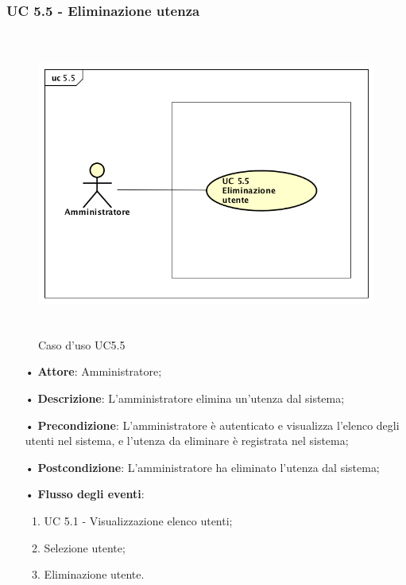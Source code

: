 \subsubsection{UC 5.5 - Eliminazione utenza}
\begin{figure}[H]
\centering
\includegraphics[width=17cm, height=10cm]{img/UC55.png} 
\caption{Caso d'uso UC5.5}
\end{figure}
\begin{itemize}
\item[•] \textbf{Attore}: Amministratore;

\item[•] \textbf{Descrizione}: L’amministratore elimina un’utenza dal sistema;

\item[•] \textbf{Precondizione}: L’amministratore \`{e} autenticato e visualizza l’elenco degli utenti nel sistema, e l’utenza da eliminare \`{e} registrata nel sistema;

\item[•] \textbf{Postcondizione}: L'amministratore ha eliminato l'utenza dal sistema; 

\item[•] \textbf{Flusso degli eventi}:

\begin{enumerate}

\item UC 5.1 - Visualizzazione elenco utenti;

\item Selezione utente;

\item Eliminazione utente.

\end{enumerate}

\end{itemize}
